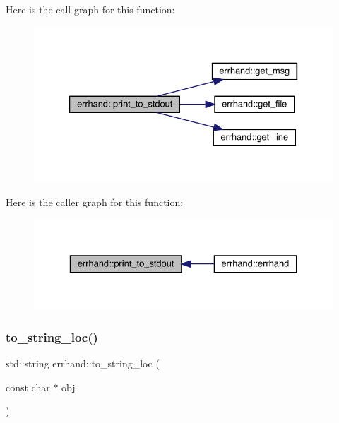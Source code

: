 Here is the call graph for this function\+:\nopagebreak
\begin{figure}[H]
\begin{center}
\leavevmode
\includegraphics[width=333pt]{classerrhand_a5b4d8a74f1d0c6842526dc8b54e38dc2_cgraph}
\end{center}
\end{figure}
Here is the caller graph for this function\+:\nopagebreak
\begin{figure}[H]
\begin{center}
\leavevmode
\includegraphics[width=329pt]{classerrhand_a5b4d8a74f1d0c6842526dc8b54e38dc2_icgraph}
\end{center}
\end{figure}
\mbox{\label{classerrhand_a930df1c197154853159683cb2ad55369}} 
\subsubsection{\texorpdfstring{to\+\_\+string\+\_\+loc()}{to\_string\_loc()}}
{\footnotesize\ttfamily std\+::string errhand\+::to\+\_\+string\+\_\+loc (\begin{DoxyParamCaption}\item[{const char $\ast$}]{obj }\end{DoxyParamCaption})\hspace{0.3cm}{\ttfamily [inline]}}

